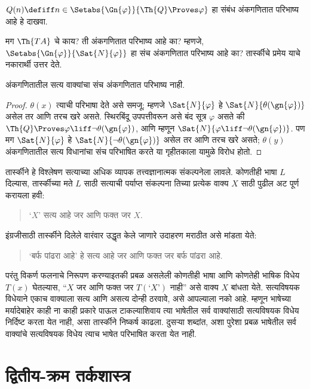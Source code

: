 \begin{prob}
$Q(n) \defiff n \in \Setabs{\Gn{\varphi}}{\Th{Q} \Proves \varphi}$
हा संबंध अंकगणितात
परिभाष्य आहे
हे दाखवा.
\end{prob}

मग $\Th{TA}$
चे काय? ती
अंकगणितात परिभाष्य
आहे का? म्हणजे,
$\Setabs{\Gn{\varphi}}{\Sat{N}{\varphi}}$
हा संच अंकगणितात
परिभाष्य आहे
का? तार्स्कीचे
प्रमेय याचे
नकारार्थी उत्तर
देते.

\begin{thm}
\label{inc:inp:tar:thm:tarski}
अंकगणितातील सत्य
वाक्यांचा संच
अंकगणितात परिभाष्य
नाही.
\end{thm}

\begin{proof}
$\theta(x)$ त्याची
परिभाषा देते असे
समजू; म्हणजे
$\Sat{N}{\varphi}$ हे
$\Sat{N}{\theta(\gn{\varphi})}$
असेल तर आणि
तरच खरे असते.
स्थिरबिंदू उपपत्तीवरून
असे बंद सूत्र $\varphi$
असते की
$\Th{Q} \Proves \varphi \liff \lnot \theta(\gn{\varphi})$,
आणि म्हणून
$\Sat{N}{\varphi \liff \lnot \theta(\gn{\varphi})}$.
पण मग
$\Sat{N}{\varphi}$ हे
$\Sat{N}{\lnot \theta(\gn{\varphi})}$
असेल तर आणि
तरच खरे असते;
$\theta(y)$ अंकगणितातील
सत्य विधानांचा
संच परिभाषित करते
या गृहीतकाला यामुळे
विरोध होतो.
\end{proof}

तार्स्कीने हे
विश्लेषण सत्याच्या
अधिक व्यापक
तत्त्वज्ञानात्मक
संकल्पनेला लावले.
कोणतीही भाषा $L$
दिल्यास, तार्स्कीच्या
मते $L$ साठी
सत्याची पर्याप्त
संकल्पना तिच्या
प्रत्येक वाक्य
$X$ साठी पुढील
अट पूर्ण करायला
हवी:
\begin{quote}
‘$X$’ सत्य आहे
जर आणि फक्त जर
$X$.
\end{quote}
इंग्रजीसाठी
तार्स्कीने दिलेले
वारंवार उद्धृत
केले जाणारे
उदाहरण मराठीत
असे मांडता येते:
\begin{quote}
‘बर्फ पांढरा आहे’
हे सत्य आहे
जर आणि फक्त जर
बर्फ पांढरा आहे.
\end{quote}
परंतु विकर्ण
फलनाचे निरूपण
करण्याइतकी प्रबळ
असलेली कोणतीही
भाषा आणि कोणतेही
भाषिक विधेय $T(x)$
घेतल्यास, “$X$
जर आणि फक्त जर
$T(\text{‘$X$’})$
नाही” असे
वाक्य $X$
बांधता येते.
सत्यविषयक विधेयाने
एकाच वाक्याला
सत्य आणि असत्य
दोन्ही ठरवावे,
असे आपल्याला
नको आहे.
म्हणून भाषेच्या
मर्यादेबाहेर
काही ना काही
प्रकारे पाऊल
टाकल्याशिवाय
त्या भाषेतील
सर्व वाक्यांसाठी
सत्यविषयक विधेय
निर्दिष्ट करता
येत नाही,
असा तार्स्कीने
निष्कर्ष काढला.
दुसऱ्या शब्दांत,
अशा पुरेशा प्रबळ भाषेतील
सर्व वाक्यांचे सत्यविषयक विधेय
त्याच भाषेत
परिभाषित करता
येत नाही.



\part{द्वितीय-क्रम तर्कशास्त्र}
